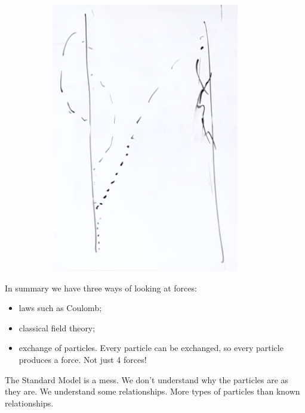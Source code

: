 \documentclass[]{article}
\begin{document}
\begin{figure}[H]
\begin{subfigure}{0.45\textwidth}
		\includegraphics[width=0.9\textwidth]{2-1-second-electron-photons-feynman}
	\end{subfigure}
\end{figure}

In summary we have three ways of looking at forces:

\begin{itemize}
	\item laws such as Coulomb;
	\item classical field theory;
	\item exchange of particles. Every particle can be exchanged, so every particle produces a force. Not just 4 forces! 
\end{itemize}

The Standard Model is a mess. We don't understand why the particles are as they are. We understand some relationships. More types of particles than known relationships.
\end{document}
